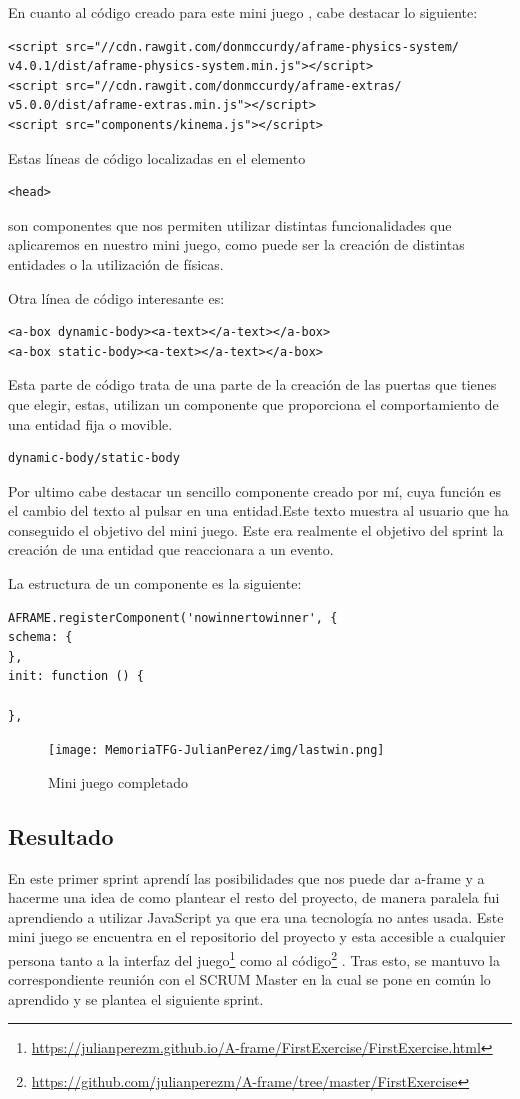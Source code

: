 \documentclass[a4paper, 12pt]{book}
\begin{document}
En cuanto al código creado para este mini juego , cabe destacar lo siguiente:
\begin{verbatim}
<script src="//cdn.rawgit.com/donmccurdy/aframe-physics-system/
v4.0.1/dist/aframe-physics-system.min.js"></script>
<script src="//cdn.rawgit.com/donmccurdy/aframe-extras/
v5.0.0/dist/aframe-extras.min.js"></script>
<script src="components/kinema.js"></script>
\end{verbatim}  
Estas líneas de código localizadas en el elemento \begin{verbatim}
<head>
\end{verbatim} son componentes que nos permiten utilizar distintas funcionalidades que aplicaremos en nuestro mini juego, como puede ser la creación de distintas entidades o la utilización de físicas.

Otra línea de código interesante es:
\begin{verbatim}
<a-box dynamic-body><a-text></a-text></a-box>
<a-box static-body><a-text></a-text></a-box>
\end{verbatim} 

Esta parte de código  trata de una parte de la creación de las puertas que tienes que elegir, estas, utilizan un componente que proporciona el comportamiento de una entidad fija o movible.\begin{verbatim}dynamic-body/static-body \end{verbatim}

Por ultimo cabe destacar un sencillo componente creado por mí, cuya función es el cambio del texto al pulsar en una entidad.Este texto muestra al usuario que ha conseguido el objetivo del mini juego.  Este era realmente el objetivo del sprint la creación de una entidad que reaccionara a un evento.

La estructura de un componente es la siguiente:
\begin{verbatim}
AFRAME.registerComponent('nowinnertowinner', {
schema: {
},
init: function () {

},
\end{verbatim} 

         \begin{figure}[H]
  \centering
  \texttt{[image: MemoriaTFG-JulianPerez/img/lastwin.png]}
  \caption{Mini juego completado}\label{scrum}
\end{figure}

\subsection{Resultado}
En este primer sprint aprendí las posibilidades que nos puede dar a-frame y a hacerme una idea de como plantear el resto del proyecto, de manera paralela fui aprendiendo a utilizar JavaScript ya que era una tecnología no antes usada. Este mini juego se encuentra en el repositorio del proyecto y esta accesible a cualquier persona tanto a la interfaz del juego\footnote{\url{https://julianperezm.github.io/A-frame/FirstExercise/FirstExercise.html}}  como al código\footnote{\url{https://github.com/julianperezm/A-frame/tree/master/FirstExercise}} . Tras esto, se mantuvo la correspondiente reunión con el SCRUM Master en la cual se pone en común lo aprendido y se plantea el siguiente sprint.
\end{document}

